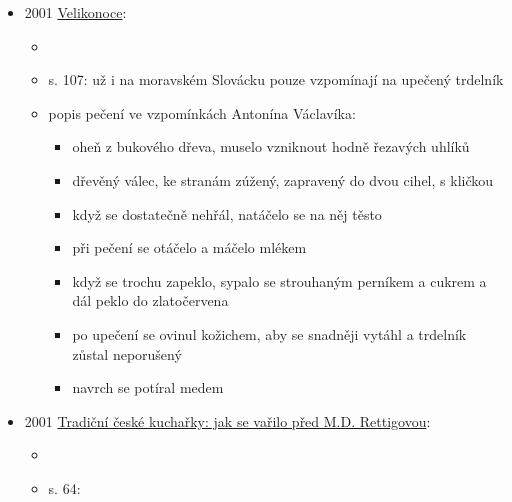 \begin{itemize}
  \begin{itemize}
  \tightlist
  \item
    článek "naše trdelníky vs americký big mac"
  \item
    o festivalu slow food ve Vrbici na Břeclavsku, kde znovuobnovovali
    zapomenutý dovednosti předků
  \item
    obrázky a popis pečení
  \item
    s. 6: Projděme s fašankem Moravu, Olga Vlasáková, masopustní zvyky
    na Moravě, smažený pečivo, boží milosti, křehotiny, šišky, trdelníky
    nebo koblihy
  \end{itemize}
\item
  2001
  \href{https://ceskadigitalniknihovna.cz/uuid/uuid:34c2b160-28d1-11e7-9efd-005056827e52}{Velikonoce}:

  \begin{itemize}
  \tightlist
  \item
  \item
    s. 107: už i na moravském Slovácku pouze vzpomínají na upečený
    trdelník
  \item
    popis pečení ve vzpomínkách Antonína Václavíka:

    \begin{itemize}
    \tightlist
    \item
      oheň z bukového dřeva, muselo vzniknout hodně řezavých uhlíků
    \item
      dřevěný válec, ke stranám zúžený, zapravený do dvou cihel, s
      kličkou
    \item
      když se dostatečně nehřál, natáčelo se na něj těsto
    \item
      při pečení se otáčelo a máčelo mlékem
    \item
      když se trochu zapeklo, sypalo se strouhaným perníkem a cukrem a
      dál peklo do zlatočervena
    \item
      po upečení se ovinul kožichem, aby se snadněji vytáhl a trdelník
      zůstal neporušený
    \item
      navrch se potíral medem
    \end{itemize}
  \end{itemize}
\item
  2001
  \href{https://www.digitalniknihovna.cz/mzk/uuid/uuid:cb2e49c0-cab1-11e7-bfaa-005056827e52}{Tradiční
  české kuchařky: jak se vařilo před M.D. Rettigovou}:

  \begin{itemize}
  \tightlist
  \item
  \item
    s. 64:


\end{itemize}
\end{itemize}
